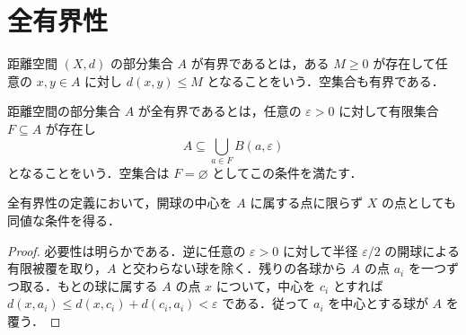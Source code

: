 \section{全有界性}
\begin{defn}[距離空間の有界部分集合]
距離空間 $(X,d)$ の部分集合 $A$ が有界であるとは，ある $M\geq0$ が存在して任意の $x,y\in A$ に対し $d(x,y)\leq M$ となることをいう．空集合も有界である．
\end{defn}
\begin{defn}[全有界部分集合]
距離空間の部分集合 $A$ が全有界であるとは，任意の $\varepsilon>0$ に対して有限集合 $F\subseteq A$ が存在し
\[
 A\subseteq\bigcup_{a\in F}B(a,\varepsilon)
\]
となることをいう．空集合は $F=\varnothing$ としてこの条件を満たす．
\end{defn}
\begin{prop}[全有界性の外部中心による判定]
全有界性の定義において，開球の中心を $A$ に属する点に限らず $X$ の点としても同値な条件を得る．
\end{prop}
\begin{proof}
必要性は明らかである．逆に任意の $\varepsilon>0$ に対して半径 $\varepsilon/2$ の開球による有限被覆を取り，$A$ と交わらない球を除く．残りの各球から $A$ の点 $a_i$ を一つずつ取る．もとの球に属する $A$ の点 $x$ について，中心を $c_i$ とすれば $d(x,a_i)\leq d(x,c_i)+d(c_i,a_i)<\varepsilon$ である．従って $a_i$ を中心とする球が $A$ を覆う．
\end{proof}
